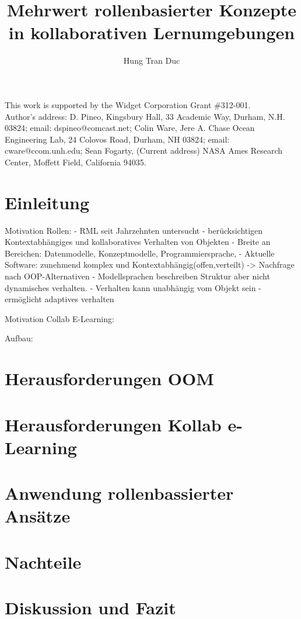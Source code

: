 \documentclass[prodmode,acmtap]{acmlarge}
\title{Mehrwert rollenbasierter Konzepte in kollaborativen Lernumgebungen}
\author{Hung Tran Duc \affil{Technische Universität Dresden} }
\begin{document}
\begin{bottomstuff}
This work is supported by the Widget Corporation Grant \#312-001.\\
Author's address: D. Pineo, Kingsbury Hall, 33 Academic Way, Durham,
N.H. 03824; email: dspineo@comcast.net; Colin Ware, Jere A. Chase
Ocean Engineering Lab, 24 Colovos Road, Durham, NH 03824; email: cware@ccom.unh.edu;
Sean Fogarty, (Current address) NASA Ames Research Center, Moffett Field, California 94035.
\end{bottomstuff}


\maketitle

\section{Einleitung}
Motivation Rollen:
- RML seit Jahrzehnten untersucht
- berücksichtigen Kontextabhängiges und kollaboratives Verhalten von Objekten
- Breite an Bereichen: Datenmodelle, Konzeptmodelle, Programmiersprache,
- Aktuelle Software: zunehmend komplex und Kontextabhängig(offen,verteilt) -> Nachfrage nach OOP-Alternativen
- Modellsprachen beschreiben Struktur aber nicht dynamisches verhalten.
- Verhalten kann unabhängig vom Objekt sein
- ermöglicht adaptives verhalten

Motivation  Collab E-Learning:

Aufbau:

\section{Herausforderungen OOM}
\section{Herausforderungen Kollab e-Learning}
\section{Anwendung rollenbassierter Ansätze}
\section{Nachteile}
\section{Diskussion und Fazit}
\end{document}
